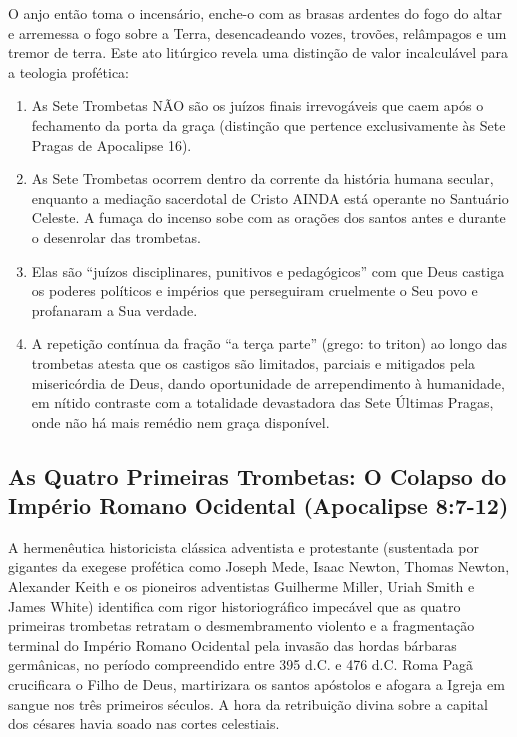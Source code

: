 \documentclass[11pt,a4paper,openany]{book}
\begin{document}
O anjo então toma o incensário, enche-o com as brasas ardentes do fogo do altar e arremessa o fogo sobre a Terra, desencadeando vozes, trovões, relâmpagos e um tremor de terra.
Este ato litúrgico revela uma distinção de valor incalculável para a teologia profética:
\begin{enumerate}
  \item As Sete Trombetas NÃO são os juízos finais irrevogáveis que caem após o fechamento da porta da graça (distinção que pertence exclusivamente às Sete Pragas de Apocalipse 16).
  \item As Sete Trombetas ocorrem dentro da corrente da história humana secular, enquanto a mediação sacerdotal de Cristo AINDA está operante no Santuário Celeste. A fumaça do incenso sobe com as orações dos santos antes e durante o desenrolar das trombetas.
  \item Elas são ``juízos disciplinares, punitivos e pedagógicos'' com que Deus castiga os poderes políticos e impérios que perseguiram cruelmente o Seu povo e profanaram a Sua verdade.
  \item A repetição contínua da fração ``a terça parte'' (grego: to triton) ao longo das trombetas atesta que os castigos são limitados, parciais e mitigados pela misericórdia de Deus, dando oportunidade de arrependimento à humanidade, em nítido contraste com a totalidade devastadora das Sete Últimas Pragas, onde não há mais remédio nem graça disponível.
\end{enumerate}




\subsection{As Quatro Primeiras Trombetas: O Colapso do Império Romano Ocidental (Apocalipse 8:7-12)}


A hermenêutica historicista clássica adventista e protestante (sustentada por gigantes da exegese profética como Joseph Mede, Isaac Newton, Thomas Newton, Alexander Keith e os pioneiros adventistas Guilherme Miller, Uriah Smith e James White) identifica com rigor historiográfico impecável que as quatro primeiras trombetas retratam o desmembramento violento e a fragmentação terminal do Império Romano Ocidental pela invasão das hordas bárbaras germânicas, no período compreendido entre 395 d.C. e 476 d.C.
Roma Pagã crucificara o Filho de Deus, martirizara os santos apóstolos e afogara a Igreja em sangue nos três primeiros séculos. A hora da retribuição divina sobre a capital dos césares havia soado nas cortes celestiais.
\end{document}
